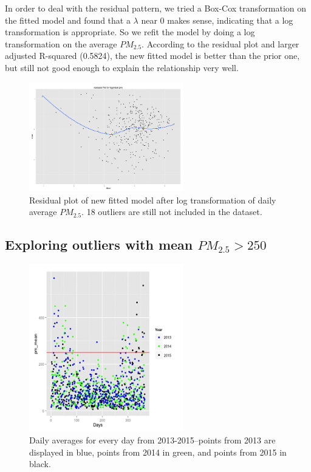 \documentclass[11pt]{article} %
\begin{document}
In order to deal with the residual pattern, we tried a Box-Cox transformation on the fitted model and found that a \(\lambda\) near 0 makes sense, indicating that a log transformation is appropriate. So we refit the model by doing a log transformation on the average \(PM_{2.5}\). According to the residual plot and larger adjusted R-squared (0.5824), the new fitted model is better than the prior one, but still not good enough to explain the relationship very well.

 \begin{figure}[!ht]
  \centering
    \includegraphics[width=0.6\textwidth]{Figure2-4}
      \caption{Residual plot of new fitted model after log transformation of daily average \(PM_{2.5}\). 18 outliers are still not included in the dataset.}
\end{figure}

\subsection{Exploring outliers with mean \(PM_{2.5} > 250\)}

 \begin{figure}[!ht]
  \centering
    \includegraphics[width=0.6\textwidth]{Figure2-5}
      \caption{Daily averages for every day from 2013-2015--points from 2013 are displayed in blue, points from 2014 in green, and points from 2015 in black.}
\end{figure}
\end{document}
